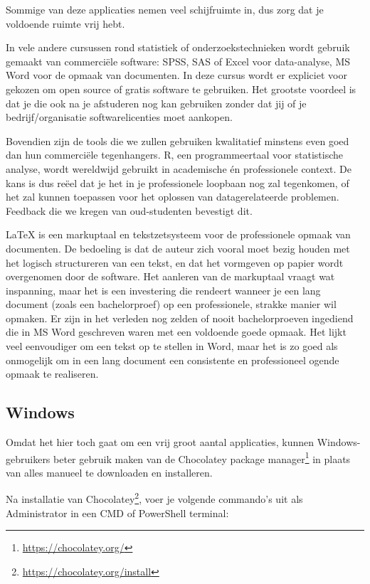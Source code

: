 Sommige van deze applicaties nemen veel schijfruimte in, dus zorg dat je voldoende ruimte vrij hebt.

In vele andere cursussen rond statistiek of onderzoekstechnieken wordt gebruik gemaakt van commerci\"ele software: SPSS, SAS of Excel voor data-analyse, MS Word voor de opmaak van documenten. In deze cursus wordt er expliciet voor gekozen om open source of gratis software te gebruiken. Het grootste voordeel is dat je die ook na je afstuderen nog kan gebruiken zonder dat jij of je bedrijf/organisatie softwarelicenties moet aankopen.

Bovendien zijn de tools die we zullen gebruiken kwalitatief minstens even goed dan hun commerci\"ele tegenhangers. R, een programmeertaal voor statistische analyse, wordt wereldwijd gebruikt in academische én professionele context. De kans is dus reëel dat je het in je professionele loopbaan nog zal tegenkomen, of het zal kunnen toepassen voor het oplossen van datagerelateerde problemen. Feedback die we kregen van oud-studenten bevestigt dit.

\LaTeX{} is een markuptaal en tekstzetsysteem voor de professionele opmaak van documenten. De bedoeling is dat de auteur zich vooral moet bezig houden met het logisch structureren van een tekst, en dat het vormgeven op papier wordt overgenomen door de software. Het aanleren van de markuptaal vraagt wat inspanning, maar het is een investering die rendeert wanneer je een lang document (zoals een bachelorproef) op een professionele, strakke manier wil opmaken. Er zijn in het verleden nog zelden of nooit bachelorproeven ingediend die in MS Word geschreven waren met een voldoende goede opmaak. Het lijkt veel eenvoudiger om een tekst op te stellen in Word, maar het is zo goed als onmogelijk om in een lang document een consistente en professioneel ogende opmaak te realiseren.

\subsection{Windows}

Omdat het hier toch gaat om een vrij groot aantal applicaties, kunnen Windows-gebruikers beter gebruik maken van de Chocolatey package manager\footnote{\url{https://chocolatey.org/}} in plaats van alles manueel te downloaden en installeren.

Na installatie van Chocolatey\footnote{\url{https://chocolatey.org/install}}, voer je volgende commando's uit als Administrator in een CMD of PowerShell terminal:

